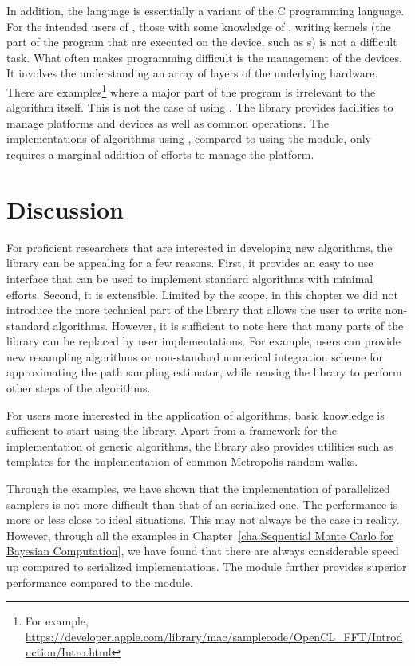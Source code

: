 In addition, the \opencl language is essentially a variant of the C
programming language. For the intended users of \vsmc, those with some
knowledge of \cpp, writing \opencl kernels (the part of the program that are
executed on the device, such as \gpu{}s) is not a difficult task. What often
makes \opencl programming difficult is the management of the devices. It
involves the understanding an array of layers of the underlying hardware.
There are examples\footnote{For example,
  \url{https://developer.apple.com/library/mac/samplecode/OpenCL_FFT/Introduction/Intro.html}}
where a major part of the program is irrelevant to the algorithm itself. This
is not the case of using \vsmc. The library provides facilities to manage
\opencl platforms and devices as well as common operations. The
implementations of \smc algorithms using \opencl, compared to using the \smp
module, only requires a marginal addition of efforts to manage the \opencl
platform.

\section{Discussion}
\label{sec:vSMC Discussion}

For \cpp proficient researchers that are interested in developing new
algorithms, the \vsmc library can be appealing for a few reasons. First, it
provides an easy to use interface that can be used to implement standard
algorithms with minimal efforts. Second, it is extensible. Limited by the
scope, in this chapter we did not introduce the more technical part of the
library that allows the user to write non-standard algorithms. However, it is
sufficient to note here that many parts of the library can be replaced by user
implementations. For example, users can provide new resampling algorithms or
non-standard numerical integration scheme for approximating the path sampling
estimator, while reusing the library to perform other steps of the algorithms.

For users more interested in the application of \smc algorithms, basic \cpp
knowledge is sufficient to start using the library. Apart from a framework for
the implementation of generic \smc algorithms, the library also provides
utilities such as templates for the implementation of common Metropolis random
walks.

Through the examples, we have shown that the implementation of parallelized
samplers is not more difficult than that of an serialized one. The performance
is more or less close to ideal situations. This may not always be the case in
reality. However, through all the examples in Chapter~\ref{cha:Sequential
  Monte Carlo for Bayesian Computation}, we have found that there are always
considerable speed up compared to serialized implementations. The \opencl
module further provides superior performance compared to the \smc module.

